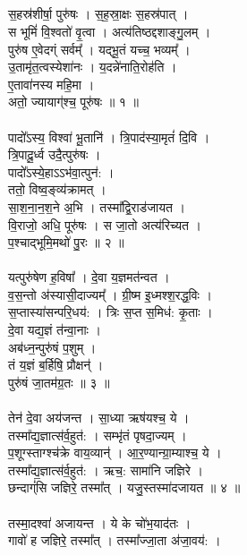 \subsection{}
स॒हस्र॑शीर्षा॒ पुरु॑षः । स॒ह॒स्रा॒क्षः स॒हस्र॑पात् ।\\
स भूमिं॑ वि॒श्वतो॑ वृ॒त्वा । अत्य॑तिष्ठद्दशाङ्गु॒लम् ।\\
पुरु॑ष ए॒वेदग्ं सर्वम्᳚ । यद्भू॒तं यच्च॒ भव्यम्᳚ ।\\
उ॒तामृ॑त॒त्वस्येशा॑नः । य॒दन्ने॑नाति॒रोह॑ति ।\\
ए॒तावा॑नस्य महि॒मा ।\\
अतो॒ ज्यायाग्॑श्च॒ पूरु॑षः ॥ १ ॥\\
\\
पादो᳚ऽस्य॒ विश्वा॑ भू॒तानि॑ । त्रि॒पाद॑स्या॒मृतं॑ दि॒वि ।\\
त्रि॒पादू॒र्ध्व उदै॒त्पुरु॑षः ।\\
पादो᳚ऽस्ये॒हाऽऽभ॑वा॒त्पुन॑: ।\\
ततो॒ विष्व॒ङ्व्य॑क्रामत् ।\\
सा॒श॒ना॒न॒श॒ने अ॒भि । तस्मा᳚द्वि॒राड॑जायत ।\\
वि॒राजो॒ अधि॒ पूरु॑षः । स जा॒तो अत्य॑रिच्यत ।\\
प॒श्चाद्भूमि॒मथो॑ पु॒रः ॥ २ ॥\\
\\
यत्पुरु॑षेण ह॒विषा᳚ । दे॒वा य॒ज्ञमत॑न्वत ।\\
व॒स॒न्तो अ॑स्यासी॒दाज्यम्᳚ । ग्री॒ष्म इ॒ध्मश्श॒रद्ध॒विः ।\\
स॒प्तास्या॑सन्परि॒धय॑: । त्रिः स॒प्त स॒मिध॑: कृ॒ताः ।\\
दे॒वा यद्य॒ज्ञं त॑न्वा॒नाः ।\\
अब॑ध्न॒न्पुरु॑षं प॒शुम् ।\\
तं य॒ज्ञं ब॒र्हिषि॒ प्रौक्षन्॑ ।\\
पुरु॑षं जा॒तम॑ग्र॒तः ॥ ३ ॥\\
\\
तेन॑ दे॒वा अय॑जन्त । सा॒ध्या ऋष॑यश्च॒ ये ।\\
तस्मा᳚द्य॒ज्ञात्स॑र्व॒हुत॑: । सम्भृ॑तं पृषदा॒ज्यम् ।\\
प॒शूग्‍स्ताग्‍श्च॑क्रे वाय॒व्यान्॑ । आ॒र॒ण्यान्ग्रा॒म्याश्च॒ ये ।\\
तस्मा᳚द्य॒ज्ञात्स॑र्व॒हुत॑: । ऋच॒: सामा॑नि जज्ञिरे ।\\
छन्दाग्ं॑सि जज्ञिरे॒ तस्मा᳚त् । यजु॒स्तस्मा॑दजायत ॥ ४ ॥\\
\\
तस्मा॒दश्वा॑ अजायन्त । ये के चो॑भ॒याद॑तः ।\\
गावो॑ ह जज्ञिरे॒ तस्मा᳚त् । तस्मा᳚ज्जा॒ता अ॑जा॒वय॑: ।\\
